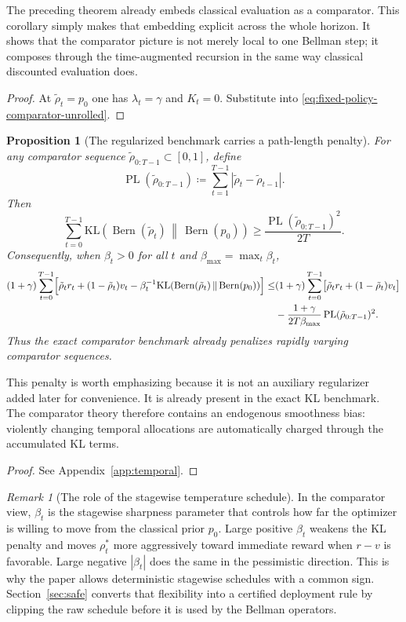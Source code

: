\documentclass{article}
\newtheorem{proposition}[proposition]{Proposition}
\theoremstyle{remark}
\newtheorem{remark}[remark]{Remark}
\DeclareMathOperator{\Bern}{Bern}
\newcommand{\KL}{\mathrm{KL}}
\newcommand{\defeq}{\coloneqq}
\newcommand{\pprior}{p_0}
\newcommand{\KLbin}[2]{\KL\!\left(\Bern(#1)\,\middle\|\,\Bern(#2)\right)}
\DeclareMathOperator{\PL}{PL}
\begin{document}
The preceding theorem already embeds classical evaluation as a comparator.
This corollary simply makes that embedding explicit across the whole horizon.
It shows that the comparator picture is not merely local to one Bellman step; it composes through the time-augmented recursion in the same way classical discounted evaluation does.

\begin{proof}
At $\tilde\rho_t=\pprior$ one has $\lambda_t=\gamma$ and $K_t=0$.
Substitute into \eqref{eq:fixed-policy-comparator-unrolled}.
\end{proof}

\begin{proposition}[The regularized benchmark carries a path-length penalty]
\label{prop:path-length-penalty}
For any comparator sequence $\tilde\rho_{0:T-1}\subset[0,1]$, define
\[
\PL(\tilde\rho_{0:T-1}) \defeq \sum_{t=1}^{T-1}|\tilde\rho_t-\tilde\rho_{t-1}|.
\]
Then
\begin{equation}
\sum_{t=0}^{T-1}\KLbin{\tilde\rho_t}{\pprior}
\ge
\frac{\PL(\tilde\rho_{0:T-1})^2}{2T}.
\label{eq:path-length-penalty}
\end{equation}
Consequently, when $\beta_t>0$ for all $t$ and $\beta_{\max}=\max_t \beta_t$,
\begin{align}
(1+\gamma)
\sum_{t=0}^{T-1}
\Bigl[
\tilde\rho_t r_t +(1-\tilde\rho_t)v_t - \beta_t^{-1}\KLbin{\tilde\rho_t}{\pprior}
\Bigr]
\le
&(1+\gamma)
\sum_{t=0}^{T-1}
\bigl[\tilde\rho_t r_t +(1-\tilde\rho_t)v_t\bigr]
\nonumber\\
&-
\frac{1+\gamma}{2T\beta_{\max}}\PL(\tilde\rho_{0:T-1})^2.
\label{eq:path-length-penalty-benchmark}
\end{align}
Thus the exact comparator benchmark already penalizes rapidly varying comparator sequences.
\end{proposition}

This penalty is worth emphasizing because it is not an auxiliary regularizer added later for convenience.
It is already present in the exact KL benchmark.
The comparator theory therefore contains an endogenous smoothness bias: violently changing temporal allocations are automatically charged through the accumulated KL terms.

\begin{proof}
See Appendix~\ref{app:temporal}.
\end{proof}

\begin{remark}[The role of the stagewise temperature schedule]
\label{rem:beta-learning-rate}
In the comparator view, $\beta_t$ is the stagewise sharpness parameter that controls how far the optimizer is willing to move from the classical prior $p_0$.
Large positive $\beta_t$ weakens the KL penalty and moves $\rho_t^*$ more aggressively toward immediate reward when $r-v$ is favorable.
Large negative $|\beta_t|$ does the same in the pessimistic direction.
This is why the paper allows deterministic stagewise schedules with a common sign.
Section~\ref{sec:safe} converts that flexibility into a certified deployment rule by clipping the raw schedule before it is used by the Bellman operators.
\end{remark}
\end{document}
